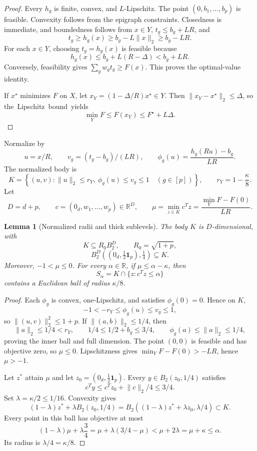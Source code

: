 \documentclass[11pt]{article}
\numberwithin{equation}{section}
\newtheorem{lemma}[lemma]{Lemma}
\theoremstyle{remark}
\theoremstyle{definition}
\newcommand{\R}{\mathbb{R}}
\newcommand{\Ball}{B_2}
\newcommand{\norm}[1]{\lVert #1\rVert_2}
\begin{document}
\begin{proof}
Every $h_g$ is finite, convex, and $L$-Lipschitz.  The point $(0,b_1,\ldots,b_p)$ is feasible.  Convexity follows from the epigraph constraints.  Closedness is immediate, and boundedness follows from $x\in Y$, $t_g\le b_g+LR$, and
\[
t_g\ge h_g(x)\ge b_g-L\norm x\ge b_g-LR.
\]
For each $x\in Y$, choosing $t_g=h_g(x)$ is feasible because
\[
h_g(x)\le b_g+L(R-\Delta)<b_g+LR.
\]
Conversely, feasibility gives $\sum_gw_gt_g\ge F(x)$.  This proves the optimal-value identity.

If $x^\star$ minimizes $F$ on $X$, let $x_Y=(1-\Delta/R)x^\star\in Y$.  Then $\norm{x_Y-x^\star}\le\Delta$, so \mbox{the Lipschitz bound yields}
\[
\min_YF\le F(x_Y)\le F^\star+L\Delta.
\]
\end{proof}

Normalize by
\[
u=x/R,
\qquad
v_g=(t_g-b_g)/(LR),
\qquad
\phi_g(u)=\frac{h_g(Ru)-b_g}{LR}.
\]
The normalized body is
\begin{equation}
K=\left\{(u,v):\norm u\le r_Y,
\ \phi_g(u)\le v_g\le1\quad(g\in[p])\right\},
\qquad
r_Y=1-\frac\kappa8.
\label{eq:normalized-body}
\end{equation}
Let
\[
D=d+p,
\qquad
c=(0_d,w_1,\ldots,w_p)\in\R^D,
\qquad
\mu=\min_{z\in K}c^Tz
=\frac{\min_YF-F(0)}{LR}.
\]

\begin{lemma}[Normalized radii and thick sublevels]
\label{lem:normalized-geometry}
The body $K$ is $D$-dimensional, with
\[
K\subseteq R_0\Ball^D,
\qquad R_0=\sqrt{1+p},
\]
\[
\Ball^D\!\left((0_d,\tfrac12\mathbf1_p),\tfrac14\right)\subseteq K.
\]
Moreover, $-1<\mu\le0$.  For every $\alpha\in\R$, if $\mu\le\alpha-\kappa$, then
\[
S_\alpha=K\cap\{z:c^Tz\le\alpha\}
\]
contains a Euclidean ball of radius $\kappa/8$.
\end{lemma}

\begin{proof}
Each $\phi_g$ is convex, one-Lipschitz, and satisfies $\phi_g(0)=0$.  Hence on $K$,
\[
-1<-r_Y\le\phi_g(u)\le v_g\le1,
\]
so $\norm{(u,v)}^2\le1+p$.  If $\norm{(a,b)}\le1/4$, then
\[
\norm a\le1/4<r_Y,
\qquad
1/4\le1/2+b_g\le3/4,
\qquad
\phi_g(a)\le\norm a\le1/4,
\]
proving the inner ball and full dimension.  The point $(0,0)$ is feasible and has objective zero, so $\mu\le0$.  Lipschitzness gives $\min_YF-F(0)>-LR$, hence $\mu>-1$.

Let $z^*$ attain $\mu$ and let $z_0=(0_d,\frac12\mathbf1_p)$.  Every $y\in\Ball(z_0,1/4)$ satisfies
\[
c^Ty\le c^Tz_0+\norm c/4\le3/4.
\]
Set $\lambda=\kappa/2\le1/16$.  Convexity gives
\[
(1-\lambda)z^*+\lambda\Ball(z_0,1/4)
=
\Ball((1-\lambda)z^*+\lambda z_0,\lambda/4)
\subset K.
\]
Every point in this ball has objective at most
\[
(1-\lambda)\mu+\lambda\frac34
=\mu+\lambda(3/4-\mu)
<\mu+2\lambda
=\mu+\kappa
\le\alpha.
\]
Its radius is $\lambda/4=\kappa/8$.
\end{proof}
\end{document}
